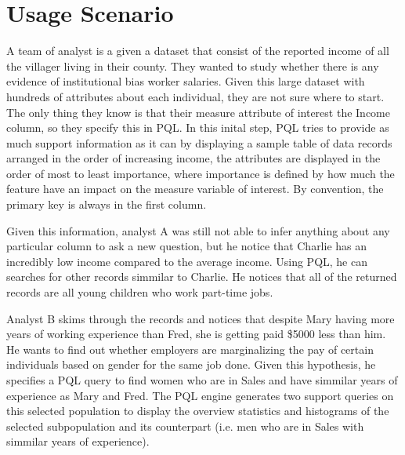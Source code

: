 \documentclass{sig-alternate-05-2015}
\begin{document}
\section{Usage Scenario}
\par A team of analyst is a given a dataset that consist of the reported income of all the villager living in their county. They wanted to study whether there is any evidence of institutional bias worker salaries. Given this large dataset with hundreds of attributes about each individual, they are not sure where to start. The only thing they know is that their measure attribute of interest the Income column, so they specify this in PQL. In this inital step, PQL tries to provide as much support information as it can by displaying a sample table of data records arranged in the order of increasing income, the attributes are displayed in the order of most to least importance, where importance is defined by how much the feature have an impact on the measure variable of interest. By convention, the primary key is always in the first column. 
\par Given this information, analyst A was still not able to infer anything about any particular column to ask a new question, but he notice that Charlie has an incredibly low income compared to the average income. Using PQL, he can searches for other records simmilar to Charlie. He notices that all of the returned records are all young children who work part-time jobs.
\par Analyst B skims through the records  and notices that despite Mary having more years of working experience than Fred, she is getting paid \$5000 less than him. He wants to find out whether employers are marginalizing the pay of certain individuals based on gender for the same job done. Given this hypothesis, he specifies a PQL query to find women who are in Sales and have simmilar years of experience as Mary and Fred. The PQL engine generates two support queries on this selected population to display the overview statistics and histograms of the selected subpopulation and its counterpart (i.e. men who are in Sales with simmilar years of experience).
\end{document}
